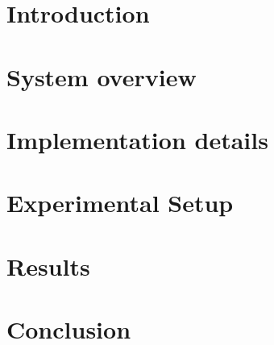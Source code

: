 \documentclass[11pt, a4paper, twocolumn]{article}
\begin{document}
    
    
    
	
    \section{Introduction}
    \label{sec:introduction}
        

    \section{System overview}
    \label{sec:systemoverview}
        
    \section{Implementation details}
    \label{sec:implementationdetails}
        
        
    \section{Experimental Setup}
    \label{sec:experimentalsetup}
        
    \section{Results}
    \label{sec:results}
        
        
    \section{Conclusion}
    \label{sec:conclusion}
        



\end{document}
